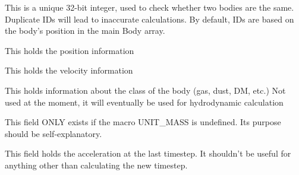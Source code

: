 \documentclass[letterpaper,10pt,english]{sphinxmanual}
\begin{document}
\begin{fulllineitems}
\label{\detokenize{body:c.Body.id}}
\end{fulllineitems}


This is a unique 32-bit integer, used to check whether two bodies are the same. Duplicate IDs will lead to inaccurate calculations. By default, IDs are based on the body’s position in the main Body array.

\begin{fulllineitems}
\label{\detokenize{body:c.Body.pos}}
\end{fulllineitems}


This holds the position information

\begin{fulllineitems}
\label{\detokenize{body:c.Body.vel}}
\end{fulllineitems}


This holds the velocity information

\begin{fulllineitems}
\label{\detokenize{body:c.Body.type}}
\end{fulllineitems}


This holds information about the class of the body (gas, dust, DM, etc.) Not used at the moment, it will eventually be used for hydrodynamic calculation

\begin{fulllineitems}
\label{\detokenize{body:c.Body.mass}}
\end{fulllineitems}


This field ONLY exists if the macro UNIT\_MASS is undefined. Its purpose should be self-explanatory.

\begin{fulllineitems}
\label{\detokenize{body:c.acc}}
\end{fulllineitems}


This field holds the acceleration at the last timestep. It shouldn’t be useful for anything other than calculating the new timestep.
\end{document}

